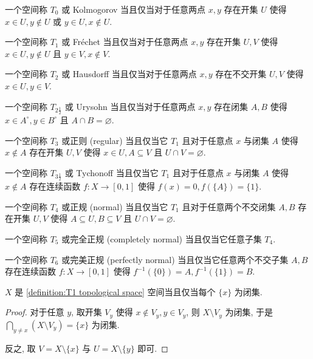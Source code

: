 \begin{definition}[分离性]
    \label {definition:T0 topological space}
    一个空间称 \(T_0\) 或 Kolmogorov 当且仅当对于任意两点 \(x,y\) 存在开集 \(U\) 使得 \(x \in U, y \notin U\) 或 \(y \in U, x \notin U\).

    \label {definition:T1 topological space}
    一个空间称 \(T_1\) 或 Fréchet 当且仅当对于任意两点 \(x,y\) 存在开集 \(U,V\) 使得 \(x \in U, y \notin U\) 且 \(y \in V, x \notin V\).

    \label {definition:T2 topological space}
    一个空间称 \(T_2\) 或 Hausdorff 当且仅当对于任意两点 \(x,y\) 存在不交开集 \(U,V\) 使得 \(x \in U, y \in V\).

    \label {definition:T5/2 topological space}
    一个空间称 \(T_{2 \frac{1}{2}}\) 或 Urysohn 当且仅当对于任意两点 \(x,y\) 存在闭集 \(A,B\) 使得 \(x \in A^\circ, y \in B^\circ\) 且 \(A \cap B = \varnothing\).

    \label {definition:T3 topological space}
    一个空间称 \(T_3\) 或正则 (regular) 当且仅当它 \(T_1\) 且对于任意点 \(x\) 与闭集 \(A\) 使得 \(x \notin A\) 存在开集 \(U,V\) 使得 \(x \in U, A \subseteq V\) 且 \(U \cap V = \varnothing\).

    \label {definition:T7/2 topological space}
    一个空间称 \(T_{3 \frac{1}{2}}\) 或 Tychonoff 当且仅当它 \(T_1\) 且对于任意点 \(x\) 与闭集 \(A\) 使得 \(x \notin A\) 存在连续函数 \(f : X \to [0,1]\) 使得 \(f(x) = 0, f (\{A\}) = \{1\}\).

    \label {definition:T4 topological space}
    一个空间称 \(T_4\) 或正规 (normal) 当且仅当它 \(T_1\) 且对于任意两个不交闭集 \(A,B\) 存在开集 \(U,V\) 使得 \(A \subseteq U, B \subseteq V\) 且 \(U \cap V = \varnothing\).

    \label {definition:T5 topological space}
    一个空间称 \(T_5\) 或完全正规 (completely normal) 当且仅当它任意子集 \(T_4\).

    \label {definition:T6 topological space}
    一个空间称 \(T_6\) 或完美正规 (perfectly normal) 当且仅当它任意两个不交子集 \(A,B\) 存在连续函数 \(f : X \to [0,1]\) 使得 \(f^{-1} (\{0\}) = A, f^{-1} (\{1\}) = B\).
\end{definition}

\begin{corollary}
    \(X\) 是 \ref{definition:T1 topological space} 空间当且仅当每个 \(\{x\}\) 为闭集.

    \begin{proof}
        对于任意 \(y\), 取开集 \(V_y\) 使得 \(x \notin V_y, y \in V_y\), 则 \(X \setminus V_y\) 为闭集, 于是 \(\bigcap_{y \neq x} (X \setminus V_y) = \{x\}\) 为闭集. 

        反之, 取 \(V = X \setminus \{x\}\) 与 \(U = X \setminus \{y\}\) 即可.
    \end{proof}
\end{corollary}

